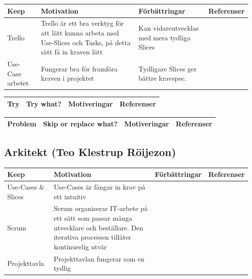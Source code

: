 \documentclass[conference,a4paper]{IEEEtran}
\newcommand\Tstrut{\rule{0pt}{2.6ex}}       %
\newcommand\Bstrut{\rule[-0.9ex]{0pt}{0pt}} %
\newcommand{\TBstrut}{\Tstrut\Bstrut} %
\begin{document}
\begin{table}[H]
	\small
  \centering
	\begin{tabular}{|p{1.5cm}|p{2cm}|p{1.8cm}|p{1.5cm}|} %
    \hline
    Keep & Motivation & Förbättringar & Referenser \TBstrut \\
    \hline
     Trello & Trello är ett bra verktyg för att lätt kunna arbeta med Use-Slices och Tasks, på detta sätt få in kraven lätt & Kan vidareutvecklas med mera tydliga Slices & \cite{Jacobson11} \TBstrut \\
    \hline
    Use-Case arbetet & Fungerar bra för framföra kraven i projektet & Tydligare Slices ger bättre kravspec. &\cite{Jacobson11} \TBstrut \\
    \hline
  \end{tabular}
\end{table}

\begin{table}[H]
	\small
  \centering
	\begin{tabular}{|p{1.5cm}|p{2cm}|p{1.8cm}|p{1.5cm}|} %
    \hline
    Try & Try what? & Motiveringar & Referenser \TBstrut \\
    \hline

  \end{tabular}
\end{table}

\begin{table}[H]
	\small
  \centering
	\begin{tabular}{|p{1.5cm}|p{2cm}|p{1.8cm}|p{1.5cm}|} %
    \hline
    Problem & Skip or replace what? & Motiveringar & Referenser \TBstrut \\
    \hline


  \end{tabular}
\end{table}

\subsection{Arkitekt (Teo Klestrup Röijezon)}
\begin{table}[H]
	\small
  \centering
	\begin{tabular}{|p{1.5cm}|p{2cm}|p{1.8cm}|p{1.5cm}|} %
    \hline
    Keep & Motivation & Förbättringar & Referenser \TBstrut \\
    \hline
    Use-Cases \& Slices & Use-Cases är fångar in krav på ett intuitiv & & \TBstrut \\
    \hline
    Scrum & Scrum organiserar IT-arbete på ett sätt som passar många utvecklare och beställare. Den iterativa processen tillåter kontinuerlig utvär & & \TBstrut \\
    \hline
    Projekttavla & Projekttavlan fungerar som en tydlig & & \TBstrut \\
    \hline
  \end{tabular}
\end{table}
\end{document}
